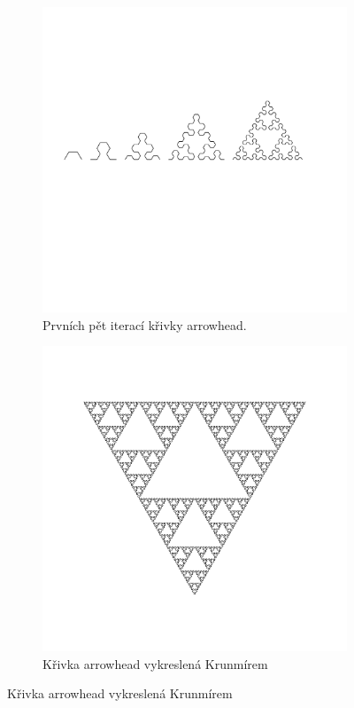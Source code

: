 \begin{figure}
  \centering
  \caption{Křivka arrowhead}
  \label{fig:krunimir-arrowhead-all}

  \begin{subfigure}{0.8\textwidth}
    \includegraphics[width=\textwidth,trim=0 250 50 150]
      {krunimir/examples/arrowhead-gen}
    \caption{Prvních pět iterací křivky arrowhead.}
    \label{fig:krunimir-arrowhead-gen}
  \end{subfigure}

  \begin{subfigure}{0.9\textwidth}
    \includegraphics[width=\textwidth]{krunimir/examples/arrowhead}
    \caption{Křivka arrowhead vykreslená Krunmírem}
    \label{fig:krunimir-arrowhead}
  \end{subfigure}
\end{figure}

